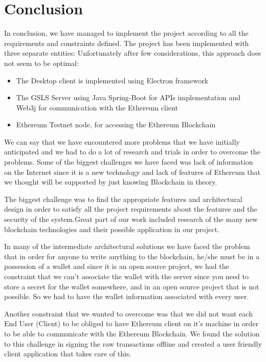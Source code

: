 \chapter{Conclusion}
\label{conclusion}

In conclusion, we have managed to implement the project according to all the requirements and constraints defined. The project has been implemented with three separate entities:
Unfortunately after few considerations, this approach does not seem to be optimal:
\begin{itemize}
	\item The Desktop client is implemented using Electron framework
	\item The GSLS Server using Java Spring-Boot for APIs implementation and Web3j for communication with the Ethereum client
	\item Ethereum Testnet node, for accessing the Ethereum Blockchain
\end{itemize}

We can say that we have encountered more problems that we have initially anticipated and we had to do a lot of research and trials in order to overcome the problems. Some of the biggest challenges we have faced was lack of information on the Internet since it is a new technology and lack of features of Ethereum that we thought will be supported by just knowing Blockchain in theory.

The biggest challenge was to find the appropriate features and architectural design in order to satisfy all the project requirements about the features and the security of the system.Great part of our work included research of the many new blockchain technologies and their possible application in our project.

In many of the intermediate architectural solutions we have faced the problem that in order for anyone to write anything to the blockchain, he/she must be in a possession of a wallet and since it is an open source project, we had the constraint that we can’t associate the wallet with the server since you need to store a secret for the wallet somewhere, and in an open source project that is not possible. So we had to have the wallet information associated with every user.

Another constraint that we wanted to overcome was that we did not want each End User (Client) to be obliged to have Ethereum client on it’s machine in order to be able to communicate with the Ethereum Blockchain. We found the solution to this challenge in signing the raw transactions offline and created a user friendly client application that takes care of this.


